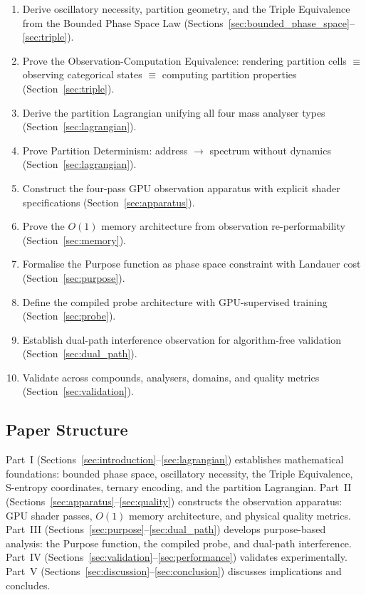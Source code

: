 \documentclass[11pt,twocolumn,a4paper]{article}
\theoremstyle{definition}
\theoremstyle{remark}
\begin{document}
\begin{enumerate}[nosep]
\item Derive oscillatory necessity, partition geometry, and the Triple Equivalence from the Bounded Phase Space Law (Sections~\ref{sec:bounded_phase_space}--\ref{sec:triple}).
\item Prove the Observation-Computation Equivalence: rendering partition cells $\equiv$ observing categorical states $\equiv$ computing partition properties (Section~\ref{sec:triple}).
\item Derive the partition Lagrangian unifying all four mass analyser types (Section~\ref{sec:lagrangian}).
\item Prove Partition Determinism: address $\to$ spectrum without dynamics (Section~\ref{sec:lagrangian}).
\item Construct the four-pass GPU observation apparatus with explicit shader specifications (Section~\ref{sec:apparatus}).
\item Prove the $O(1)$ memory architecture from observation re-performability (Section~\ref{sec:memory}).
\item Formalise the Purpose function as phase space constraint with Landauer cost (Section~\ref{sec:purpose}).
\item Define the compiled probe architecture with GPU-supervised training (Section~\ref{sec:probe}).
\item Establish dual-path interference observation for algorithm-free validation (Section~\ref{sec:dual_path}).
\item Validate across compounds, analysers, domains, and quality metrics (Section~\ref{sec:validation}).
\end{enumerate}

\subsection{Paper Structure}

Part~I (Sections~\ref{sec:introduction}--\ref{sec:lagrangian}) establishes mathematical foundations: bounded phase space, oscillatory necessity, the Triple Equivalence, S-entropy coordinates, ternary encoding, and the partition Lagrangian. Part~II (Sections~\ref{sec:apparatus}--\ref{sec:quality}) constructs the observation apparatus: GPU shader passes, $O(1)$ memory architecture, and physical quality metrics. Part~III (Sections~\ref{sec:purpose}--\ref{sec:dual_path}) develops purpose-based analysis: the Purpose function, the compiled probe, and dual-path interference. Part~IV (Sections~\ref{sec:validation}--\ref{sec:performance}) validates experimentally. Part~V (Sections~\ref{sec:discussion}--\ref{sec:conclusion}) discusses implications and concludes.
\end{document}
